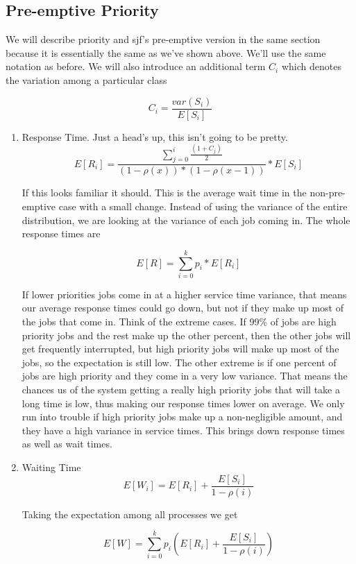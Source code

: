 \subsection{Pre-emptive Priority}

We will describe priority and sjf's pre-emptive version in the same section because it is essentially the same as we've shown above.
We'll use the same notation as before.
We will also introduce an additional term $C_i$ which denotes the variation among a particular class

\[
    C_i = \frac{var(S_i)}{E[S_i]}
\]

\begin{enumerate}
\item Response Time. Just a head's up, this isn't going to be pretty.
  \[
  E[R_i] = \frac{\sum\limits_{j=0}^i\frac{(1 + C_j)}{2}}{(1 - \rho(x))*( 1 - \rho(x-1))} * E[S_i]
  \]

  If this looks familiar it should.
  This is the average wait time in the non-pre-emptive case with a small change. Instead of using the variance of the entire distribution, we are looking at the variance of each job coming in.
  The whole response times are

  \[
     E[R] = \sum\limits_{i = 0}^k p_i * E[R_i]
  \]

  If lower priorities jobs come in at a higher service time variance, that means our average response times could go down, but not if they make up most of the jobs that come in.
  Think of the extreme cases.
  If 99\% of jobs are high priority jobs and the rest make up the other percent, then the other jobs will get frequently interrupted, but high priority jobs will make up most of the jobs, so the expectation is still low.
  The other extreme is if one percent of jobs are high priority and they come in a very low variance.
  That means the chances us of the system getting a really high priority jobs that will take a long time is low, thus making our response times lower on average.
  We only run into trouble if high priority jobs make up a non-negligible amount, and they have a high variance in service times.
  This brings down response times as well as wait times.

\item Waiting Time
  \[
  E[W_i] = E[R_i] + \frac{E[S_i]}{1 - \rho(i)}
  \]

  Taking the expectation among all processes we get

  \[
  E[W] = \sum\limits_{i = 0}^k p_i (E[R_i] + \frac{E[S_i]}{1 - \rho(i)})
  \]


\end{enumerate}
